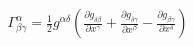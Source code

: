 \documentclass[preview]{standalone}
\begin{document}
\begin{align*}
\Gamma^\alpha_{\beta\gamma} = \frac{1}{2} g^{\alpha\delta}\left( \frac{\partial g_{\delta\beta}}{\partial x^\gamma}+ \frac{\partial g_{\delta\gamma}}{\partial x^\beta}- \frac{\partial g_{\beta\gamma}}{\partial x^\delta} \right)
\end{align*}
\end{document}
